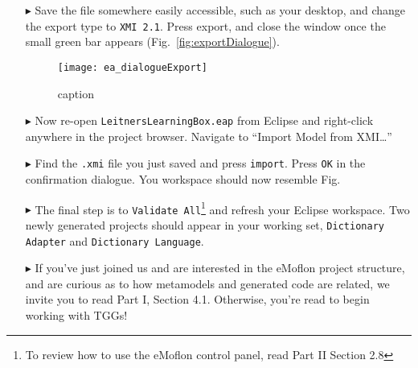 \begin{itemize}
\item[$\blacktriangleright$] Save the file somewhere easily accessible, such as your desktop, and change the export type to \texttt{XMI 2.1}. Press export,
and close the window once the small green bar appears (Fig.~\ref{fig:exportDialogue}).

\vspace{0.5cm}

\begin{figure}[htbp]
\begin{center}
  \texttt{[image: ea\_dialogueExport]}
  \caption{caption}
  \label{fig:export}
\end{center}
\end{figure}

\item[$\blacktriangleright$] Now re-open \texttt{LeitnersLearningBox.eap} from Eclipse and right-click anywhere in the project browser. Navigate to ``Import
Model from XMI\ldots''

\item[$\blacktriangleright$] Find the \texttt{.xmi} file you just saved and press \texttt{import}. Press \texttt{OK} in the confirmation dialogue. You workspace
should now resemble Fig. \update

\item[$\blacktriangleright$] The final step is to \texttt{Validate All}\footnote{To review how to use the eMoflon control panel, read Part II Section 2.8} and
refresh your Eclipse workspace. Two newly generated projects should appear in your working set, \texttt{Dictionary Adapter} and \texttt{Dictionary Language}. 

\item[$\blacktriangleright$] If you've just joined us and are interested in the eMoflon project structure, and are curious as to how metamodels and generated
code are related, we invite you to read Part I, Section 4.1. Otherwise, you're read to begin working with TGGs! 


\end{itemize}
